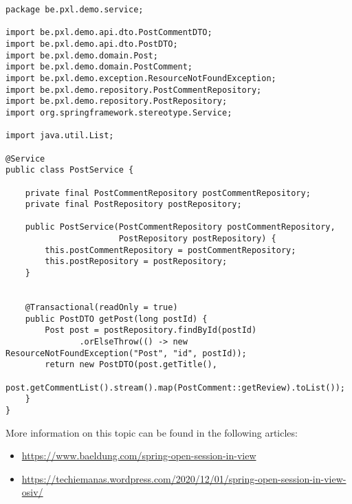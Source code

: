 \begin{lstlisting}
package be.pxl.demo.service;

import be.pxl.demo.api.dto.PostCommentDTO;
import be.pxl.demo.api.dto.PostDTO;
import be.pxl.demo.domain.Post;
import be.pxl.demo.domain.PostComment;
import be.pxl.demo.exception.ResourceNotFoundException;
import be.pxl.demo.repository.PostCommentRepository;
import be.pxl.demo.repository.PostRepository;
import org.springframework.stereotype.Service;

import java.util.List;

@Service
public class PostService {

    private final PostCommentRepository postCommentRepository;
    private final PostRepository postRepository;

    public PostService(PostCommentRepository postCommentRepository,
                       PostRepository postRepository) {
        this.postCommentRepository = postCommentRepository;
        this.postRepository = postRepository;
    }

   
	@Transactional(readOnly = true)
    public PostDTO getPost(long postId) {
        Post post = postRepository.findById(postId)
               .orElseThrow(() -> new ResourceNotFoundException("Post", "id", postId));
        return new PostDTO(post.getTitle(), 
                 post.getCommentList().stream().map(PostComment::getReview).toList());
    }
}
\end{lstlisting}


More information on this topic can be found in the following articles:
\begin{itemize} 
\item \url{
https://www.baeldung.com/spring-open-session-in-view}
\item \url{https://techiemanas.wordpress.com/2020/12/01/spring-open-session-in-view-osiv/}

\end{itemize}

